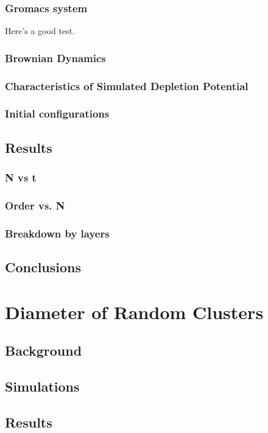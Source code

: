 \documentclass[pre,preprint]{revtex4-1}
\begin{document}
\subsubsection{Gromacs system}
\label{sec-2.2.1}

Here's a good test. \cite{Deng2009}
\subsubsection{Brownian Dynamics}
\label{sec-2.2.2}
\subsubsection{Characteristics of Simulated Depletion Potential}
\label{sec-2.2.3}
\subsubsection{Initial configurations}
\label{sec-2.2.4}
\subsection{Results}
\label{sec-2.3}
\subsubsection{N vs t}
\label{sec-2.3.1}
\subsubsection{Order vs. N}
\label{sec-2.3.2}
\subsubsection{Breakdown by layers}
\label{sec-2.3.3}
\subsection{Conclusions}
\label{sec-2.4}
\section{Diameter of Random Clusters}
\label{sec-3}
\subsection{Background}
\label{sec-3.1}
\subsection{Simulations}
\label{sec-3.2}
\subsection{Results}
\label{sec-3.3}
\end{document}
